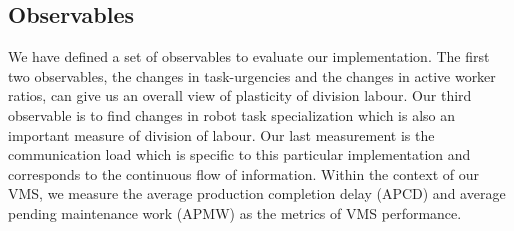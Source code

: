 \subsection{Observables}
We have defined a set of observables to evaluate our implementation. The first two observables, the changes in task-urgencies and the changes in active worker ratios, can give us an overall view of plasticity of division labour. Our third observable is to find changes in robot task specialization which is also an important measure of division of labour. Our last measurement is the communication load which is specific to this particular implementation and corresponds to the continuous flow of information. Within the context of our VMS, we measure the average production completion delay (APCD) and average pending maintenance work (APMW) as the metrics of VMS performance.
% 
